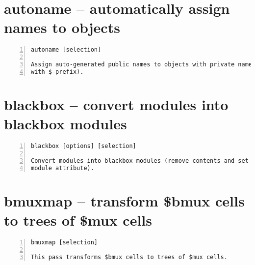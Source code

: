 \section{autoname -- automatically assign names to objects}
\label{cmd:autoname}
\begin{lstlisting}[numbers=left,frame=single]
    autoname [selection]

Assign auto-generated public names to objects with private names (the ones
with $-prefix).
\end{lstlisting}

\section{blackbox -- convert modules into blackbox modules}
\label{cmd:blackbox}
\begin{lstlisting}[numbers=left,frame=single]
    blackbox [options] [selection]

Convert modules into blackbox modules (remove contents and set the blackbox
module attribute).
\end{lstlisting}

\section{bmuxmap -- transform \$bmux cells to trees of \$mux cells}
\label{cmd:bmuxmap}
\begin{lstlisting}[numbers=left,frame=single]
    bmuxmap [selection]

This pass transforms $bmux cells to trees of $mux cells.
\end{lstlisting}

